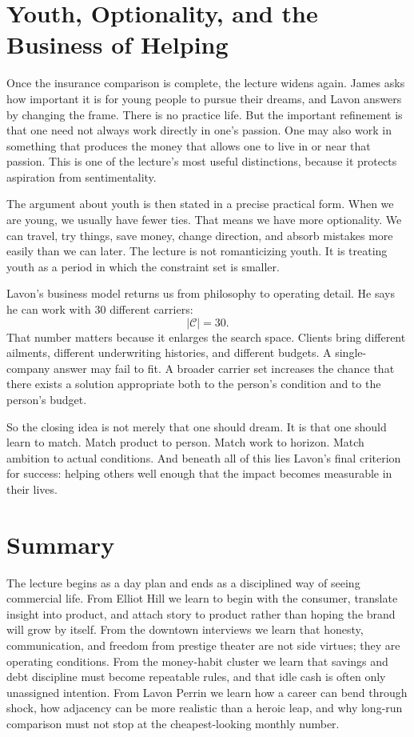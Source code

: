 \section{Youth, Optionality, and the Business of Helping}

Once the insurance comparison is complete, the lecture widens again. James asks how important it is for young people to pursue their dreams, and Lavon answers by changing the frame. There is no practice life. But the important refinement is that one need not always work directly in one's passion. One may also work in something that produces the money that allows one to live in or near that passion. This is one of the lecture's most useful distinctions, because it protects aspiration from sentimentality.

The argument about youth is then stated in a precise practical form. When we are young, we usually have fewer ties. That means we have more optionality. We can travel, try things, save money, change direction, and absorb mistakes more easily than we can later. The lecture is not romanticizing youth. It is treating youth as a period in which the constraint set is smaller.

Lavon's business model returns us from philosophy to operating detail. He says he can work with \(30\) different carriers:
\begin{equation}
|\mathcal C| = 30.
\end{equation}
That number matters because it enlarges the search space. Clients bring different ailments, different underwriting histories, and different budgets. A single-company answer may fail to fit. A broader carrier set increases the chance that there exists a solution appropriate both to the person's condition and to the person's budget.

So the closing idea is not merely that one should dream. It is that one should learn to match. Match product to person. Match work to horizon. Match ambition to actual conditions. And beneath all of this lies Lavon's final criterion for success: helping others well enough that the impact becomes measurable in their lives.

\section{Summary}

The lecture begins as a day plan and ends as a disciplined way of seeing commercial life. From Elliot Hill we learn to begin with the consumer, translate insight into product, and attach story to product rather than hoping the brand will grow by itself. From the downtown interviews we learn that honesty, communication, and freedom from prestige theater are not side virtues; they are operating conditions. From the money-habit cluster we learn that savings and debt discipline must become repeatable rules, and that idle cash is often only unassigned intention. From Lavon Perrin we learn how a career can bend through shock, how adjacency can be more realistic than a heroic leap, and why long-run comparison must not stop at the cheapest-looking monthly number.


